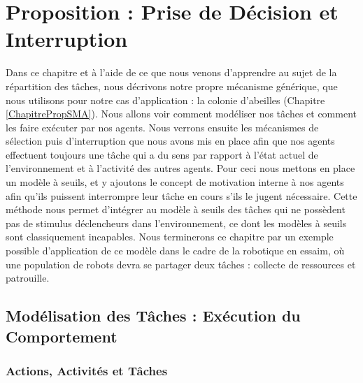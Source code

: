 \chapter{Proposition : Prise de Décision et Interruption}
\label{ChapitrePropDecision}
	Dans ce chapitre et à l'aide de ce que nous venons d'apprendre au sujet de la répartition des tâches, nous décrivons notre propre mécanisme générique, que nous utilisons pour notre cas d'application : la colonie d'abeilles (Chapitre \ref{ChapitrePropSMA}). Nous allons voir comment modéliser nos tâches et comment les faire exécuter par nos agents. Nous verrons ensuite les mécanismes de sélection puis d'interruption que nous avons mis en place afin que nos agents effectuent toujours une tâche qui a du sens par rapport à l'état actuel de l'environnement et à l'activité des autres agents. Pour ceci nous mettons en place un modèle à seuils, et y ajoutons le concept de motivation interne à nos agents afin qu'ils puissent interrompre leur tâche en cours s'ils le jugent nécessaire. Cette méthode nous permet d'intégrer au modèle à seuils des tâches qui ne possèdent pas de stimulus déclencheurs dans l'environnement, ce dont les modèles à seuils sont classiquement incapables. Nous terminerons ce chapitre par un exemple possible d'application de ce modèle dans le cadre de la robotique en essaim, où une population de robots devra se partager deux tâches : collecte de ressources et patrouille.
	
	\section{Modélisation des Tâches : Exécution du Comportement}	
	
		\subsection{Actions, Activités et Tâches}
